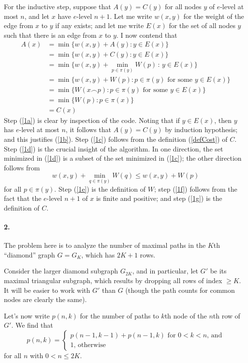 \documentclass[
]{article}
\begin{document}
For the inductive step, suppose that $A(y)=C(y)$ for all nodes $y$ of $e$-level at most $n$, and let $x$ have $e$-level $n+1$.  Let me write $w(x,y)$ for the weight of the edge from $x$ to $y$ if any exists; and let me write $E(x)$ for the set of all nodes $y$ such that there is an edge from $x$ to $y$.  
I now contend that
\begin{align}
A(x)
&=\label{1a}
\min\{w(x,y)+A(y):y\in E(x)\}\\
&=\label{1b}
\min\{w(x,y)+C(y):y\in E(x)\}\\
&=\label{1c}
\min\{{w(x,y)+\!\min_{p\in \pi(y)}\!\! W(p)} \,:\, y \in E(x)\}\\
&=\label{1d}
\min\{w(x,y)+W(p): p \in \pi(y)\text{ for some }y\in E(x) \}\\
&=\label{1e}
\min\{W(x\frown p): p \in \pi(y)\text{ for some }y\in E(x) \}\\
&=\label{1f}
\min\{W(p): p\in \pi(x)\}\\
&=\label{1g}
C(x)
\end{align}
Step (\ref{1a}) is clear by inspection of the code.  Noting that if $y\in E(x)$, then $y$ has $e$-level at most $n$, it follows that $A(y)=C(y)$ by induction hypothesis; and this justifies (\ref{1b}).  Step (\ref{1c}) follows from the definition (\ref{defCost}) of $C$.
Step (\ref{1d}) is the crucial insight of the algorithm.  In one direction, the set minimized in (\ref{1d}) is a subset of the set minimized in (\ref{1c});  the other direction follows from 
\begin{equation*}
w(x,y) + \min_{q\in \pi(y)}W(q) \leq w(x,y) + W(p)
\end{equation*}
for all $p\in \pi(y)$.  
Step (\ref{1e}) is the definition of $W$; 
step (\ref{1f}) follows from the fact that the $e$-level $n+1$ of $x$ is finite and positive; and step (\ref{1g}) is the definition of $C$.

\paragraph{2.} The problem here is to analyze the number of maximal paths in the $K$th ``diamond'' graph $G=G_K$, which has $2K+1$ rows.

Consider the larger diamond subgraph $G_{2K}$, and in particular, let $G'$ be its maximal triangular subgraph, which results by dropping all rows of index $\geq K$.  It will be easier to work with $G'$ than $G$ (though the path counts for common nodes are clearly the same).

Let's now write $p(n,k)$ for the number of paths to $k$th node of the $n$th row of $G'$.  We find that 
\begin{equation}
p(n,k)=\begin{cases}
\text{$p(n-1, k-1)+p(n-1, k)$ for $0<k<n$, and}\\
1\text{, otherwise}
\end{cases}
\end{equation}
for all $n$ with $0<n\leq 2K$.
\end{document}
